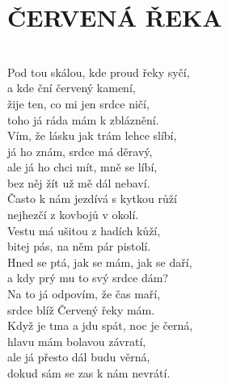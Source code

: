 \section*{\Huge ČERVENÁ ŘEKA}\\

Pod tou skálou, kde proud řeky syčí,\\
a kde ční červený kamení,\hspace{0,5cm} \\
žije ten, co mi jen srdce ničí,\\
toho já ráda mám k zbláznění.\\

Vím, že lásku jak trám lehce slíbí,\\
já ho znám, srdce má děravý,\\
ale já ho chci mít, mně se líbí,\\
bez něj žít už mě dál nebaví.\\

Často k nám jezdívá s kytkou růží\\
nejhezčí z kovbojů v okolí.\\
Vestu má ušitou z hadích kůží,\\
bitej pás, na něm pár pistolí.\\

Hned se ptá, jak se mám, jak se daří,\\
a kdy prý mu to svý srdce dám?\\
Na to já odpovím, že čas maří,\\
srdce blíž Červený řeky mám.\\

Když je tma a jdu spát, noc je černá,\\
hlavu mám bolavou závratí,\\
ale já přesto dál budu věrná,\\
dokud sám se zas k nám nevrátí.

\newpage
